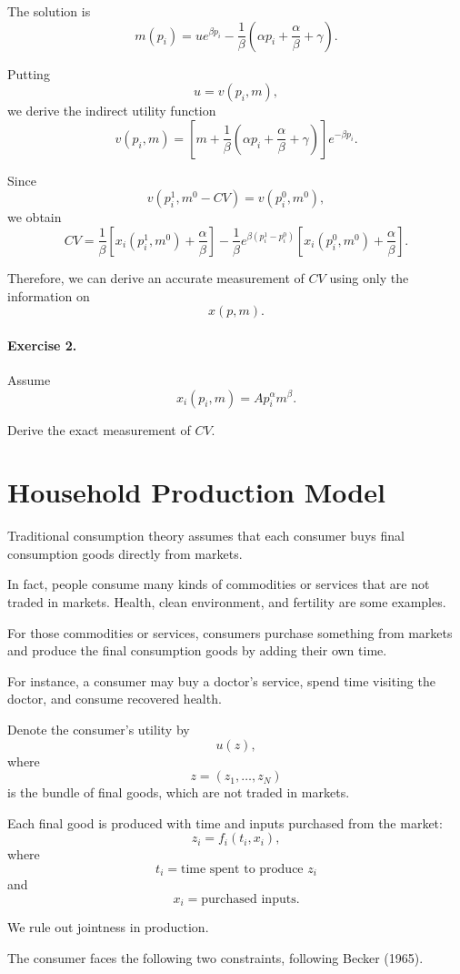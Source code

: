 The solution is
\[
m(p_i)
=
u e^{\beta p_i}
-
\frac{1}{\beta}
\left(
\alpha p_i+\frac{\alpha}{\beta}+\gamma
\right).
\]

Putting
\[
u=v(p_i,m),
\]
we derive the indirect utility function
\[
v(p_i,m)
=
\left[
m
+
\frac{1}{\beta}
\left(
\alpha p_i+\frac{\alpha}{\beta}+\gamma
\right)
\right]
e^{-\beta p_i}.
\]

Since
\[
v(p_i^1,m^0-CV)
=
v(p_i^0,m^0),
\]
we obtain
\[
CV
=
\frac{1}{\beta}
\left[
x_i(p_i^1,m^0)
+
\frac{\alpha}{\beta}
\right]
-
\frac{1}{\beta}
e^{\beta(p_i^1-p_i^0)}
\left[
x_i(p_i^0,m^0)
+
\frac{\alpha}{\beta}
\right].
\]

Therefore, we can derive an accurate measurement of \(CV\) using only the information on
\[
x(p,m).
\]

\paragraph{Exercise 2.}
Assume
\[
x_i(p_i,m)
=
A p_i^\alpha m^\beta.
\]

Derive the exact measurement of \(CV\).

\section{Household Production Model}

Traditional consumption theory assumes that each consumer buys final consumption goods directly from markets.

In fact, people consume many kinds of commodities or services that are not traded in markets. Health, clean environment, and fertility are some examples.

For those commodities or services, consumers purchase something from markets and produce the final consumption goods by adding their own time.

For instance, a consumer may buy a doctor's service, spend time visiting the doctor, and consume recovered health.

Denote the consumer's utility by
\[
u(z),
\]
where
\[
z=(z_1,\dots,z_N)
\]
is the bundle of final goods, which are not traded in markets.

Each final good is produced with time and inputs purchased from the market:
\[
z_i=f_i(t_i,x_i),
\]
where
\[
t_i
=
\text{time spent to produce } z_i
\]
and
\[
x_i
=
\text{purchased inputs}.
\]

We rule out jointness in production.

The consumer faces the following two constraints, following Becker (1965).

